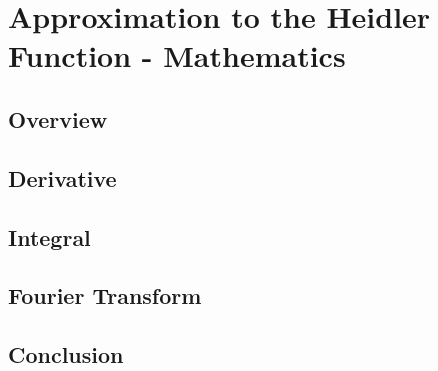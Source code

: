 
\chapter{Approximation to the Heidler Function - Mathematics} %

\label{AppendixMath} %



\section{Overview}
\label{sec:app_math_overview}


\section{Derivative}
\label{sec:app_math_derivative}


\section{Integral}
\label{sec:app_math_integral}


\section{Fourier Transform}
\label{sec:app_math_fourier}


\section{Conclusion}
\label{sec:app_math_conclusion}
